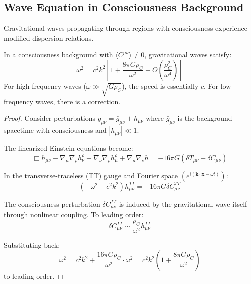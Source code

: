 \subsection{Wave Equation in Consciousness Background}

Gravitational waves propagating through regions with consciousness experience modified dispersion relations.

\begin{theorem}\label{thm:gw-consciousness-dispersion}
In a consciousness background with $\langle C^{\mu\nu} \rangle \neq 0$, gravitational waves satisfy:
\begin{equation}
\boxed{\omega^2 = c^2 k^2 \left[ 1 + \frac{8\pi G \rho_C}{\omega^2} + O\left( \frac{\rho_C^2}{\omega^4} \right) \right]}
\end{equation}
For high-frequency waves ($\omega \gg \sqrt{G\rho_C}$), the speed is essentially $c$. For low-frequency waves, there is a correction.
\end{theorem}

\begin{proof}
Consider perturbations $g_{\mu\nu} = \bar{g}_{\mu\nu} + h_{\mu\nu}$ where $\bar{g}_{\mu\nu}$ is the background spacetime with consciousness and $|h_{\mu\nu}| \ll 1$.

The linearized Einstein equations become:
\begin{equation}
\Box h_{\mu\nu} - \nabla_\mu \nabla_\rho h^\rho_\nu - \nabla_\nu \nabla_\rho h^\rho_\mu + \nabla_\mu \nabla_\nu h = -16\pi G \left( \delta T_{\mu\nu} + \delta C_{\mu\nu} \right)
\end{equation}

In the transverse-traceless (TT) gauge and Fourier space $(e^{i(\mathbf{k} \cdot \mathbf{x} - \omega t)})$:
\begin{equation}
(-\omega^2 + c^2 k^2) h^{TT}_{\mu\nu} = -16\pi G \delta C^{TT}_{\mu\nu}
\end{equation}

The consciousness perturbation $\delta C^{TT}_{\mu\nu}$ is induced by the gravitational wave itself through nonlinear coupling. To leading order:
\begin{equation}
\delta C^{TT}_{\mu\nu} \sim \frac{\rho_C}{\omega^2} h^{TT}_{\mu\nu}
\end{equation}

Substituting back:
\begin{equation}
\omega^2 = c^2 k^2 + \frac{16\pi G \rho_C}{\omega^2} \cdot \omega^2 = c^2 k^2 \left( 1 + \frac{8\pi G \rho_C}{\omega^2} \right)
\end{equation}
to leading order.
\end{proof}

